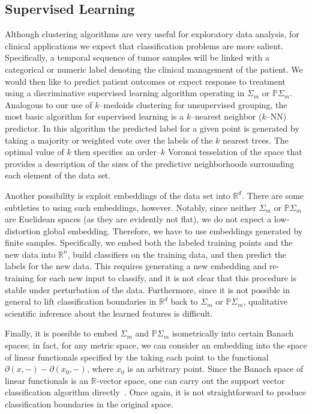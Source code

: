 \documentclass[a4paper,11pt]{article}
\begin{document}
\subsection{Supervised Learning}

Although clustering algorithms are very useful for exploratory data analysis, for clinical applications we expect that classification problems are more salient.
Specifically, a temporal sequence of tumor samples will be linked with a categorical or numeric label denoting the clinical management of the patient.
We would then like to predict patient outcomes or expect response to treatment using a discriminative supervised learning algorithm operating in $\Sigma_m$ or $\mathbb{P}\Sigma_m$.
Analogous to our use of $k$--medoids clustering for unsupervised grouping, the most basic algorithm for supervised learning is a $k$--nearest neighbor ($k$--NN) predictor.
In this algorithm the predicted label for a given point is generated by taking a majority or weighted vote over the labels of the $k$ nearest trees.
The optimal value of $k$ then specifies an order--$k$ Voronoi tesselation of the space that provides a description of the sizes of the predictive neighborhoods surrounding each element of the data set.

Another possibility is exploit embeddings of the data set into $\mathbb{R}^d$.
There are some subtleties to using such embeddings, however.
Notably, since neither $\Sigma_m$ or $\mathbb{P}\Sigma_m$ are Euclidean spaces (as they are evidently not flat), we do not expect a low-distortion global embedding.
Therefore, we have to use embeddings generated by finite samples.
Specifically, we embed both the labeled training points and the new data into $\mathbb{R}^n$, build classifiers on the training data, and then predict the labels for the new data.
This requires generating a new embedding and re-training for each new input to classify, and it is not clear that this procedure is stable under perturbation of the data.
Furthermore, since it is not possible in general to lift classification boundaries in $\mathbb{R}^d$ back to $\Sigma_m$ or $\mathbb{P}\Sigma_m$, qualitative scientific inference about the learned features is difficult.

Finally, it is possible to embed $\Sigma_m$ and $\mathbb{P}\Sigma_m$ isometrically into certain Banach spaces; in fact, for any metric space, we can consider an embedding into the space of linear functionals specified by the taking each point to the functional $\partial(x,-) - \partial(x_0,-)$, where $x_0$ is an arbitrary point.
Since the Banach space of linear functionals is an $\mathbb{R}$-vector space, one can carry out the support vector classification algorithm directly~\cite{hein2003}.
Once again, it is not straightforward to produce classification boundaries in the original space.
\end{document}
